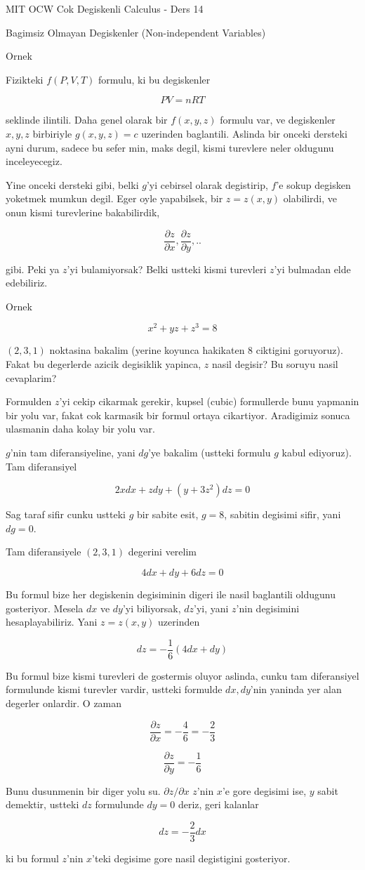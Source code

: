\documentclass[12pt,fleqn]{article}
\begin{document}
MIT OCW Cok Degiskenli Calculus - Ders 14

Bagimsiz Olmayan Degiskenler (Non-independent Variables)

Ornek

Fizikteki $f(P,V,T)$ formulu, ki bu degiskenler 

\[ PV = nRT \]

seklinde ilintili. Daha genel olarak bir $f(x,y,z)$ formulu var, ve
degiskenler $x,y,z$ birbiriyle $g(x,y,z) = c$ uzerinden baglantili. Aslinda
bir onceki dersteki ayni durum, sadece bu sefer min, maks degil, kismi
turevlere neler oldugunu inceleyecegiz. 

Yine onceki dersteki gibi, belki $g$'yi cebirsel olarak degistirip, $f$'e
sokup degisken yoketmek mumkun degil. Eger oyle yapabilsek, bir $z =
z(x,y)$ 
olabilirdi, ve onun kismi turevlerine bakabilirdik,

\[ \frac{\partial z}{\partial x}, \frac{\partial z}{\partial y}, .. \]

gibi. Peki ya $z$'yi bulamiyorsak? Belki ustteki kismi turevleri $z$'yi
bulmadan elde edebiliriz. 

Ornek

\[ x^2 + yz + z^3 = 8 \]

$(2,3,1)$ noktasina bakalim (yerine koyunca hakikaten 8 ciktigini
goruyoruz). Fakat bu degerlerde azicik degisiklik yapinca, $z$ nasil
degisir? Bu soruyu nasil cevaplarim? 

Formulden $z$'yi cekip cikarmak gerekir, kupsel (cubic) formullerde bunu
yapmanin bir yolu var, fakat cok karmasik bir formul ortaya
cikartiyor. Aradigimiz sonuca ulasmanin daha kolay bir yolu var. 

$g$'nin tam diferansiyeline, yani $dg$'ye bakalim (ustteki formulu $g$
kabul ediyoruz). Tam diferansiyel

\[ 2x dx + z dy + (y+3z^2) dz = 0\]

Sag taraf sifir cunku ustteki $g$ bir sabite esit, $g=8$, sabitin degisimi
sifir, yani $dg=0$. 

Tam diferansiyele $(2,3,1)$ degerini verelim

\[ 4dx + dy + 6dz = 0 \]

Bu formul bize her degiskenin degisiminin digeri ile nasil baglantili
oldugunu gosteriyor. Mesela $dx$ ve $dy$'yi biliyorsak, $dz$'yi, yani
$z$'nin degisimini hesaplayabiliriz. Yani $z=z(x,y)$ uzerinden 

\[ dz = -\frac{1}{6}(4dx + dy) \]

Bu formul bize kismi turevleri de gostermis oluyor aslinda, cunku tam
diferansiyel formulunde kismi turevler vardir, ustteki formulde $dx,dy$'nin
yaninda yer alan degerler onlardir. O zaman

\[ \frac{\partial z}{\partial x} = -\frac{4}{6} = -\frac{2}{3} \]

\[ \frac{\partial z}{\partial y} = -\frac{1}{6} \]

Bunu dusunmenin bir diger yolu su. $\partial z/\partial x$ $z$'nin $x$'e
gore degisimi ise, $y$ sabit demektir, ustteki $dz$ formulunde $dy=0$
deriz, geri kalanlar

\[ dz = -\frac{2}{3}dx \]

ki bu formul $z$'nin $x$'teki degisime gore nasil degistigini gosteriyor. 
\end{document}
